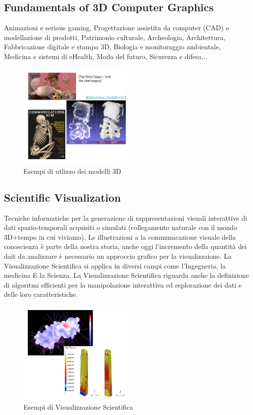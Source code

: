 \subsection{Fundamentals of 3D Computer Graphics}
Animazioni e serious gaming, 
Progettazione assistita da computer (CAD) e modellazione di prodotti, 
Patrimonio culturale, Archeologia, Architettura, Fabbricazione digitale e stampa 3D, Biologia e monitoraggio ambientale, 
Medicina e sistemi di eHealth, Moda del futuro, Sicurezza e difesa...

\begin{figure}[H]
    \centering
    \includegraphics[width=0.5\textwidth]{images/3Dexp.png} %
    \caption{Esempi di utlizzo dei modelli 3D}
    \label{fig:immagine}
\end{figure}
\subsection{Scientific Visualization}
Tecniche informatiche per la generazione di rappresentazioni visuali interattive di dati spazio-temporali acquisiti o simulati 
(collegamento naturale con il mondo 3D+tempo in cui viviamo). Le illustrazioni a la communicazione visuale della conoscienza è parte della nostra storia, anche oggi l'incremento 
della quantità dei dait da analizzare è necessario un approccio grafico per la visualizzaione.
La Visualizzazione Scientifica si applica in diversi campi come l'Ingegneria, la medicina E la Scienza.
La Visualizzazione Scientifica riguarda anche la definizione di algoritmi efficienti per la manipolazione interattiva ed esplorazione dei dati e delle loro caratteristiche.

\begin{figure}[H]
    \centering
    \includegraphics[width=0.5\textwidth]{images/ScientImage.png} %
    \caption{Esempi di Visualizzazione Scientifica}
    \label{fig:immagine}
\end{figure}
